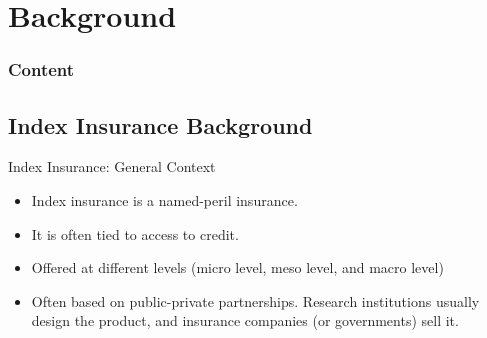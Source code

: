 \documentclass{beamer}
\begin{document}
    

\section{Background}
\begin{frame}
    \frametitle{Content}
    \tableofcontents[currentsection]
  \end{frame}
\subsection{Index Insurance Background}
\begin{frame}{Index Insurance: General Context}
    \begin{itemize}
        \setlength\itemsep{1em}
        \item Index insurance is a named-peril insurance.
        \item It is often tied to access to credit.
        \item Offered at different levels (micro level, meso level, and macro level)
        \item Often based on public-private partnerships. Research institutions usually design the product, and insurance companies (or governments) sell it. 
    \end{itemize}
    \end{frame} 
\end{document}
